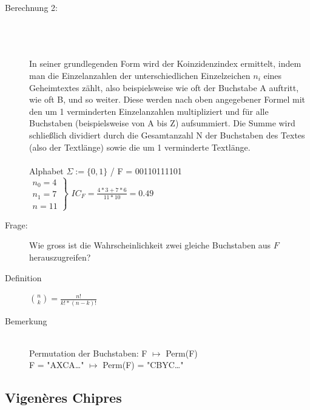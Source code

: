 \documentclass[10pt]{article}
\newcommand{\Brackar}[2]{\left.\begin{array}{#1} #2 \end{array}\right\rbrace} %
\newcommand{\Sum}[2]{\sum_{#2}^{#1}} %
\begin{document}
\begin{description}
	\item[Berechnung 2:] \hfill \\
		 \\\\
		In seiner grundlegenden Form wird der Koinzidenzindex ermittelt, indem man die Einzelanzahlen  der unterschiedlichen Einzelzeichen $n_i$ eines Geheimtextes zählt, also beispielsweise wie oft der Buchstabe A auftritt, wie oft B, und so weiter. Diese werden nach oben angegebener Formel mit den um 1 verminderten Einzelanzahlen multipliziert und für alle Buchstaben (beispielsweise von A bis Z) aufsummiert. Die Summe wird schließlich dividiert durch die Gesamtanzahl N der Buchstaben des Textes (also der Textlänge) sowie die um 1 verminderte Textlänge. \\
	\\
	Alphabet $\Sigma := \{0,1\}$ / F = 00110111101 \\
	$\Brackar{l}{n_0=4 \\ n_1=7 \\ \hline n=11 }$ $IC_F=\frac{4*3+7*6}{11*10}=0.49$ \\
	
	\item[Frage:] Wie gross ist die Wahrscheinlichkeit zwei gleiche Buchstaben aus $F$ herauszugreifen?
	\item[Definition] \fbox{$\mathbf{IC_F}=\frac{\Sum{26}{1}{n_i\choose2}}{{n\choose2}}$} {\color{gray}${n \choose k}=\frac{n!}{k!*(n-k)!}$}

	\item[Bemerkung] \hfill \\
		Permutation der Buchstaben: F $\mapsto$ Perm(F)  \\
		F = "{}AXCA\dots" $\mapsto$ Perm(F) = "{}CBYC\dots" \\
		
\end{description}

\subsection{Vigenères Chipres}
\end{document}
